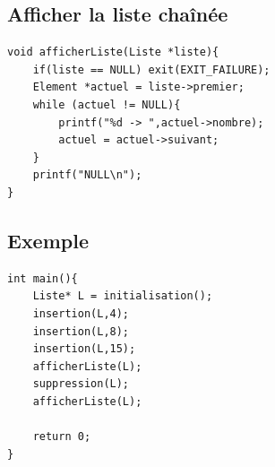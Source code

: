 \documentclass[a4paper]{article}
\begin{document}
\subsection{Afficher la liste chaînée}
\begin{verbatim}
void afficherListe(Liste *liste){
    if(liste == NULL) exit(EXIT_FAILURE);
    Element *actuel = liste->premier;
    while (actuel != NULL){
        printf("%d -> ",actuel->nombre);
        actuel = actuel->suivant;
    }
    printf("NULL\n");
}
\end{verbatim}
\subsection{Exemple}
\begin{verbatim}
int main(){
    Liste* L = initialisation();
    insertion(L,4);
    insertion(L,8);
    insertion(L,15);
    afficherListe(L);
    suppression(L);
    afficherListe(L);
    
    return 0;
}
\end{verbatim}
\end{document}
